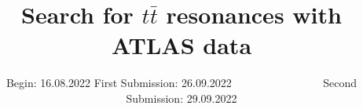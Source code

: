 


\title{Search for $t\bar{t}$ resonances with ATLAS data}
\date{%
  Begin: 16.08.2022
  \hspace{3em}
  First Submission:  26.09.2022
  \textcolor{white}{Begin: 16.08.2022} \hspace{3em} Second Submission: 29.09.2022
}



\maketitle
\thispagestyle{empty}
\tableofcontents
\newpage






\printbibliography[title={Literature}]{}


